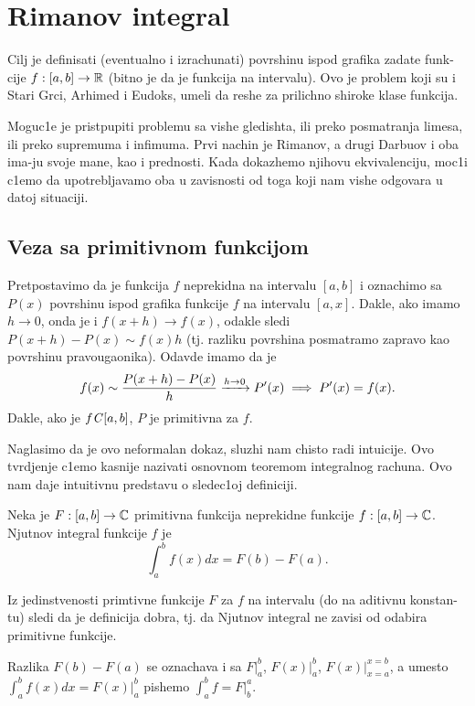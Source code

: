 \documentclass[../main.tex]{subfiles}
\begin{document}
\section{Rimanov integral}

    Cilj je definisati (eventualno i izrachunati) povrshinu ispod grafika zadate funk-cije $f:[a,b]\to \mathbb{R}$ (bitno je da je funkcija na intervalu). 
    Ovo je problem koji su i Stari Grci, Arhimed i Eudoks, umeli da reshe za prilichno
    shiroke klase funkcija.

    Moguc1e je pristpupiti problemu sa vishe gledishta, ili preko posmatranja limesa, ili preko supremuma i infimuma. Prvi nachin je Rimanov, a drugi Darbuov i oba ima-ju
    svoje mane, kao i prednosti. Kada dokazhemo njihovu ekvivalenciju, moc1i c1emo da upotrebljavamo oba u zavisnosti od toga koji nam vishe odgovara u datoj situaciji.

\subsection{Veza sa primitivnom funkcijom}

    Pretpostavimo da je funkcija $f$ neprekidna na intervalu $[a,b]$ i oznachimo sa $P(x)$ povrshinu ispod grafika funkcije $f$ na intervalu $[a,x]$.
    Dakle, ako imamo $h \to 0$, onda je i $f(x+h)\to f(x)$, odakle sledi $P(x+h)-P(x) \sim f(x) h$ (tj. razliku povrshina posmatramo zapravo kao povrshinu pravougaonika).
    Odavde imamo da je \[f(x) \sim \dfrac{P(x+h)-P(x)}{h}\xrightarrow{h\to 0}P'(x)\\
	\implies P'(x)=f(x).
    \]
    Dakle, ako je $f\mathit{C} [a,b]$, $P$ je primitivna za $f$.

    Naglasimo da je ovo neformalan dokaz, sluzhi nam chisto radi intuicije. Ovo tvrdjenje c1emo kasnije nazivati osnovnom teoremom integralnog rachuna.
    Ovo nam daje intuitivnu predstavu o sledec1oj definiciji.

    \begin{de}
    	Neka je $F:[a,b]\to \mathbb{C}$ primitivna funkcija neprekidne funkcije $f:[a,b]\to \mathbb{C}$. Njutnov integral funkcije $f$ je 
	\[ \int_a^bf(x)dx=F(b)-F(a).\]
    \end{de}
    Iz jedinstvenosti primtivne funkcije $F$ za $f$ na intervalu (do na aditivnu konstan-tu) sledi da je definicija dobra, tj. da Njutnov integral ne zavisi od odabira
    primitivne funkcije.

    Razlika $F(b)-F(a)$ se oznachava i sa $F|_a^b$, $F(x)|_a^b$, $F(x)|_{x=a}^{x=b}$, a umesto $\int_a^bf(x)dx=F(x)|_a^b$ pishemo $\int_a^bf=F|_b^a$.
    
\end{document}
